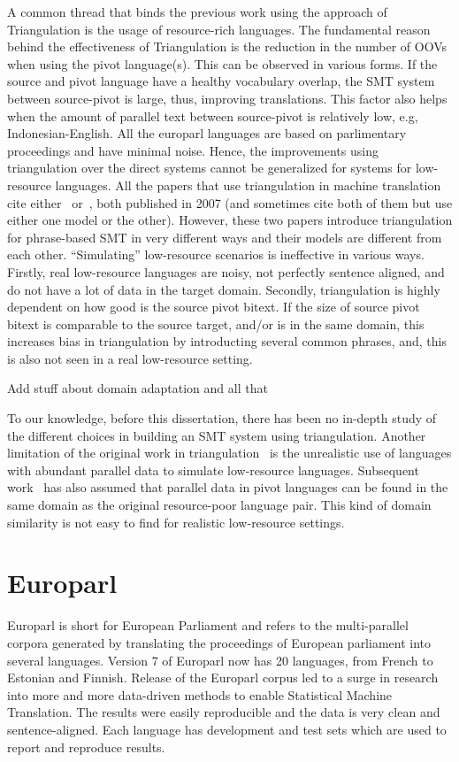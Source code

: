  
 A common thread that binds the previous work using the approach of Triangulation is the usage of resource-rich languages. The fundamental reason behind the effectiveness of Triangulation is the reduction in the number of OOVs when using the pivot language(s). This can be observed in various forms. If the source and pivot language have a healthy vocabulary overlap, the SMT system between source-pivot is large, thus, improving translations. This factor also helps when the amount of parallel text between source-pivot is relatively low, e.g, Indonesian-English.  All the europarl languages are based on parlimentary proceedings and have minimal noise. Hence, the improvements using triangulation over the direct systems cannot be generalized for systems for low-resource languages. All the papers that use triangulation in machine translation cite either~\cite{Utiyama:07} or~\cite{Cohn:07}, both published in 2007 (and sometimes cite both of them but use either one model or the other). However, these two papers introduce triangulation for phrase-based SMT in very different ways and their models are different from each other. ``Simulating'' low-resource scenarios is ineffective in various ways. Firstly, real low-resource languages are noisy, not perfectly sentence aligned, and do not have a lot of data in the target domain. Secondly, triangulation is highly dependent on how good is the source pivot bitext. If the size of source pivot bitext is comparable to the source target, and/or is in the same domain, this increases bias in triangulation by introducting several common phrases, and, this is also not seen in a real low-resource setting.

 \alert{Add stuff about domain adaptation and all that}



 To our knowledge, before this dissertation, there has been no in-depth study of the different choices in building an SMT system using triangulation. Another limitation of the original work in triangulation~\cite{Utiyama:07,Cohn:07} is the unrealistic use of languages with abundant parallel data to simulate low-resource languages. Subsequent work~\cite{Nakov:12,Nakovemnlp:12,Gispert:06,Huck:12} has also assumed that parallel data in pivot languages can be found in the same domain as the original resource-poor language pair. This kind of domain similarity is not easy to find for realistic low-resource settings.

 \section{Europarl}
 \label{sec:europarl}
Europarl is short for European Parliament and refers to the multi-parallel corpora generated by translating the proceedings of European parliament into several languages. Version 7 of Europarl now has 20 languages, from French to Estonian and Finnish. Release of the Europarl corpus led to a surge in research into more and more data-driven methods to enable Statistical Machine Translation. The results were easily reproducible and the data is very clean and sentence-aligned. Each language has development and test sets which are used to report and reproduce results. 

